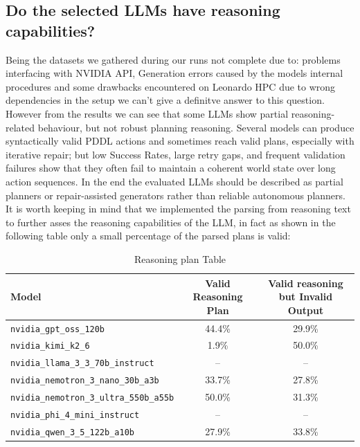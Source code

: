 \subsection{Do the selected LLMs have reasoning capabilities?}
Being the datasets we gathered during our runs not complete due to: problems interfacing with NVIDIA API, Generation errors caused by the models internal procedures and some drawbacks encountered on Leonardo HPC due to wrong dependencies in the setup we can't give a definitve answer to this question.\\
However from the results we can see that some LLMs show partial reasoning-related behaviour, but not robust planning reasoning. Several models can produce syntactically valid PDDL actions and sometimes reach valid plans, especially with iterative repair; but low Success Rates, large retry gaps, and frequent validation failures show that they often fail to maintain a coherent world state over long action sequences. In the end the evaluated LLMs should be described as partial planners or repair-assisted generators rather than reliable autonomous planners.\\
It is worth keeping in mind that we implemented the parsing from reasoning text to further asses the reasoning capabilities of the LLM, in fact as shown in the following table only a small percentage of the parsed plans is valid:

\begin{table}[H]
\centering
\begin{tabular}{l|c|c}

\hline
\label{tab:llm_reasoning_plans}
\textbf{Model} & \textbf{Valid Reasoning Plan} & \textbf{Valid reasoning but Invalid Output}\\
\hline
\texttt{nvidia\_gpt\_oss\_120b} & 44.4\% & 29.9\% \\
\texttt{nvidia\_kimi\_k2\_6} & 1.9\% & 50.0\% \\
\texttt{nvidia\_llama\_3\_3\_70b\_instruct} & -- & -- \\
\texttt{nvidia\_nemotron\_3\_nano\_30b\_a3b} & 33.7\% & 27.8\% \\
\texttt{nvidia\_nemotron\_3\_ultra\_550b\_a55b} & 50.0\% & 31.3\% \\
\texttt{nvidia\_phi\_4\_mini\_instruct} & -- & -- \\
\texttt{nvidia\_qwen\_3\_5\_122b\_a10b} & 27.9\% & 33.8\% \\
\hline
\end{tabular}
\caption{Reasoning plan Table}
\end{table}


